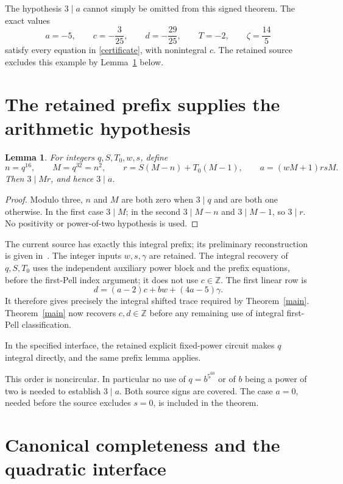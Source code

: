 \documentclass[11pt]{article}
\newtheorem{lemma}[theorem]{Lemma}
\newcommand{\Z}{\mathbb Z}\newcommand{\Q}{\mathbb Q}
\begin{document}
The hypothesis \(3\mid a\) cannot simply be omitted from this
signed theorem. The exact values
\[
 a=-5,\qquad c=-\frac3{25},\qquad d=-\frac{29}{25},
 \qquad T=-2,\qquad\zeta=\frac{14}5
\]
satisfy every equation in \eqref{certificate}, with nonintegral \(c\).
The retained source excludes this example by Lemma~\ref{prefix} below.

\section{The retained prefix supplies the arithmetic hypothesis}

\begin{lemma}\label{prefix}
For integers \(q,S,T_0,w,s\), define
\[
 n=q^{16},\qquad M=q^{32}=n^2,\qquad
 r=S(M-n)+T_0(M-1),\qquad a=(wM+1)rsM.
\]
Then \(3\mid Mr\), and hence \(3\mid a\).
\end{lemma}
\begin{proof}
Modulo three, \(n\) and \(M\) are both zero when \(3\mid q\)
and are both one otherwise. In the first case \(3\mid M\);
in the second \(3\mid M-n\) and \(3\mid M-1\), so
\(3\mid r\). No positivity or power-of-two hypothesis is used.
\end{proof}

The current source has exactly this integral prefix; its preliminary
reconstruction is given in~\cite[Section 2]{Signed}. The integer
inputs \(w,s,\gamma\) are retained. The integral recovery of
\(q,S,T_0\) uses the independent auxiliary power block and the
prefix equations, before the first-Pell index argument; it does not
use \(c\in\Z\). The first linear row is
\[
                   d=(a-2)c+bw+(4a-5)\gamma.
\]
It therefore gives precisely the integral shifted trace required by
Theorem~\ref{main}. Theorem~\ref{main} now recovers \(c,d\in\Z\)
before any remaining use of integral first-Pell classification.

In the specified interface, the retained explicit fixed-power circuit
makes \(q\) integral directly, and the same prefix lemma applies.

This order is noncircular. In particular no use of \(q=b^{5^{60}}\)
or of \(b\) being a power of two is needed to establish \(3\mid a\).
Both source signs are covered. The case \(a=0\), needed before
the source excludes \(s=0\), is included in the theorem.

\section{Canonical completeness and the quadratic interface}
\end{document}
